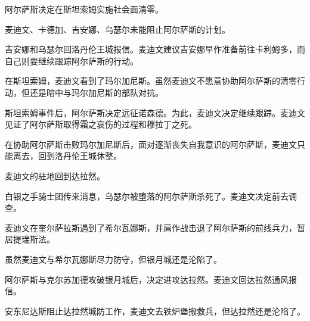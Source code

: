 阿尔萨斯决定在斯坦索姆实施社会面清零。

麦迪文、卡德加、吉安娜、乌瑟尔未能阻止阿尔萨斯的计划。

吉安娜和乌瑟尔回洛丹伦王城报信。麦迪文建议吉安娜早作准备前往卡利姆多，而自己则要继续跟踪阿尔萨斯的行动。

在斯坦索姆，麦迪文看到了玛尔加尼斯。虽然麦迪文不愿意协助阿尔萨斯的清零行动，但还是暗中与玛尔加尼斯的部队对抗。

斯坦索姆事件后，阿尔萨斯决定远征诺森德。为此，麦迪文决定继续跟踪。麦迪文见证了阿尔萨斯取得霜之哀伤的过程和穆拉丁之死。


在协助阿尔萨斯击败玛尔加尼斯后，面对逐渐丧失自我意识的阿尔萨斯，麦迪文只能离去，回到洛丹伦王城休整。





麦迪文的驻地回到达拉然。










\clearpage{} %


白银之手骑士团传来消息，乌瑟尔被堕落的阿尔萨斯杀死了。麦迪文决定前去调查。

麦迪文在奎尔萨拉斯遇到了希尔瓦娜斯，并肩作战击退了阿尔萨斯的前线兵力，暂居提瑞斯法。


虽然麦迪文与希尔瓦娜斯尽力防守，但银月城还是沦陷了。



阿尔萨斯与克尔苏加德攻破银月城后，决定进攻达拉然。麦迪文回达拉然通风报信。

安东尼达斯阻止达拉然城防工作，麦迪文去铁炉堡搬救兵，但达拉然还是沦陷了。











